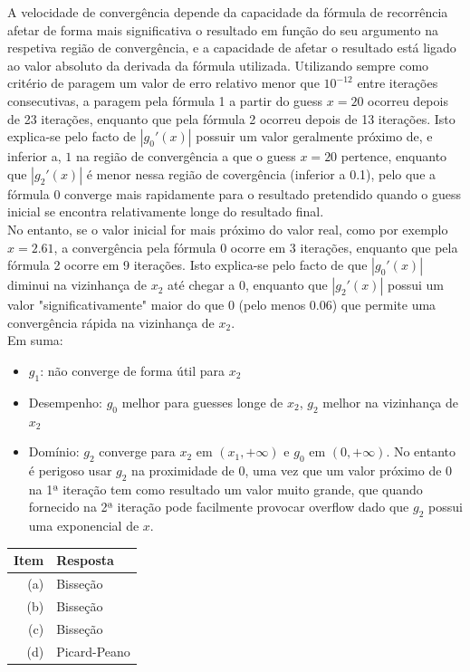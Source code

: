 A velocidade de convergência depende da capacidade da fórmula de recorrência afetar de forma mais significativa o resultado em função do seu argumento na respetiva região de convergência, e a capacidade de afetar o resultado está ligado ao valor absoluto da derivada da fórmula utilizada.
Utilizando sempre como critério de paragem um valor de erro relativo menor que $10^{-12}$ entre iterações consecutivas, a paragem pela fórmula 1 a partir do guess $x=20$ ocorreu depois de 23 iterações, enquanto que pela fórmula 2 ocorreu depois de 13 iterações. Isto explica-se pelo facto de $|g_0'(x)|$ possuir um valor geralmente próximo de, e inferior a, $1$ na região de convergência a que o guess $x=20$ pertence, enquanto que $|g_2'(x)|$ é menor nessa região de covergência (inferior a 0.1), pelo que a fórmula 0 converge mais rapidamente para o resultado pretendido quando o guess inicial se encontra relativamente longe do resultado final.\\
No entanto, se o valor inicial for mais próximo do valor real, como por exemplo $x=2.61$, a convergência pela fórmula 0 ocorre em 3 iterações, enquanto que pela fórmula 2 ocorre em 9 iterações. Isto explica-se pelo facto de que $|g_0'(x)|$ diminui na vizinhança de $x_2$ até chegar a $0$, enquanto que $|g_2'(x)|$ possui um valor "significativamente" maior do que $0$ (pelo menos 0.06) que permite uma convergência rápida na vizinhança de $x_2$.\\
Em suma:
\begin{itemize}
	\item $g_1$: não converge de forma útil para $x_2$
	\item Desempenho: $g_0$ melhor para guesses longe de $x_2$, $g_2$ melhor na vizinhança de $x_2$
	\item Domínio: $g_2$ converge para $x_2$ em $(x_1,+\infty)$ e $g_0$ em $(0,+\infty)$. No entanto é perigoso usar $g_2$ na proximidade de $0$, uma vez que um valor próximo de $0$ na 1ª iteração tem como resultado um valor muito grande, que quando fornecido na 2ª iteração pode facilmente provocar overflow dado que $g_2$ possui uma exponencial de $x$.
\end{itemize}
\begin{center} \begin{tabular}{r | l}
	\textbf{Item} & \textbf{Resposta} \\ \hline
	(a) & Bisseção \\
	(b) & Bisseção \\
	(c) & Bisseção \\
	(d) & Picard-Peano
\end{tabular} \end{center}
